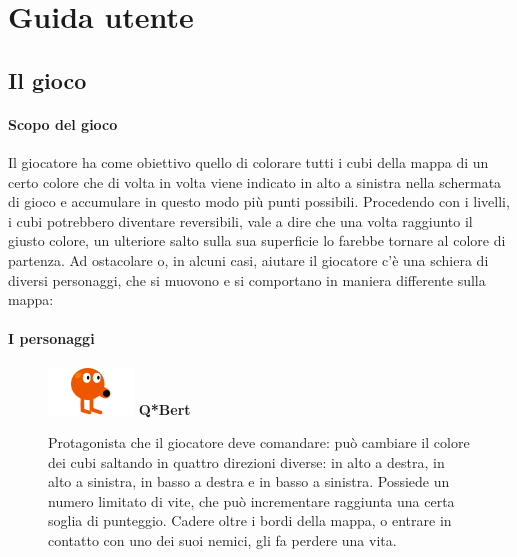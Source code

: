 \documentclass[a4paper,12pt, hidelinks]{report}
\begin{document}
\appendix
\chapter{Guida utente}

\section{Il gioco}

\subsubsection{Scopo del gioco}

Il giocatore ha come obiettivo quello di colorare tutti i cubi della mappa di un certo colore che di volta in volta viene indicato in alto a sinistra nella schermata di gioco e accumulare in questo modo più punti possibili. Procedendo con i livelli, i cubi potrebbero diventare reversibili, vale a dire che una volta raggiunto il giusto colore, un ulteriore salto sulla sua superficie lo farebbe tornare al colore di partenza. Ad ostacolare o, in alcuni casi, aiutare il giocatore c'è una schiera di diversi personaggi, che si muovono e si comportano in maniera differente sulla mappa:

\subsubsection{I personaggi}

\begin{figure}[H]
		\item
		\includegraphics[width=0.15\linewidth]{img/Qbert}
		\label{img:Q*Bert}
		\textbf{Q*Bert}

		Protagonista che il giocatore deve comandare: può cambiare il colore dei cubi saltando in quattro direzioni diverse: in alto a destra, in alto a sinistra, in basso a destra e in basso a sinistra. Possiede un numero limitato di vite, che può incrementare raggiunta una certa soglia di punteggio. Cadere oltre i bordi della mappa, o entrare in contatto con uno dei suoi nemici, gli fa perdere una vita.

\end{figure}
\end{document}
